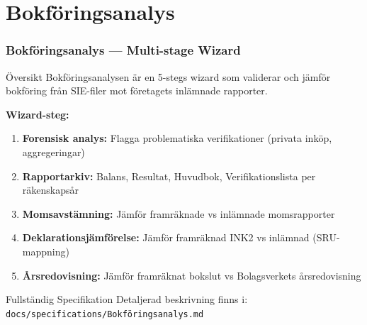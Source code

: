 \documentclass[10pt]{beamer}
\begin{document}
\section{Bokföringsanalys}

\begin{frame}
  \frametitle{Bokföringsanalys — Multi-stage Wizard}
  \begin{block}{Översikt}
    Bokföringsanalysen är en 5-stegs wizard som validerar och jämför bokföring från SIE-filer mot företagets inlämnade rapporter.
  \end{block}

  \vspace{0.3cm}
  \textbf{Wizard-steg:}
  \begin{enumerate}
    \item \textbf{Forensisk analys:} Flagga problematiska verifikationer (privata inköp, aggregeringar)
    \item \textbf{Rapportarkiv:} Balans, Resultat, Huvudbok, Verifikationslista per räkenskapsår
    \item \textbf{Momsavstämning:} Jämför framräknade vs inlämnade momsrapporter
    \item \textbf{Deklarationsjämförelse:} Jämför framräknad INK2 vs inlämnad (SRU-mappning)
    \item \textbf{Årsredovisning:} Jämför framräknat bokslut vs Bolagsverkets årsredovisning
  \end{enumerate}

  \vspace{0.3cm}
  \begin{alertblock}{Fullständig Specifikation}
    Detaljerad beskrivning finns i:\\
    \texttt{docs/specifications/Bokföringsanalys.md}
  \end{alertblock}
\end{frame}

\end{document}

